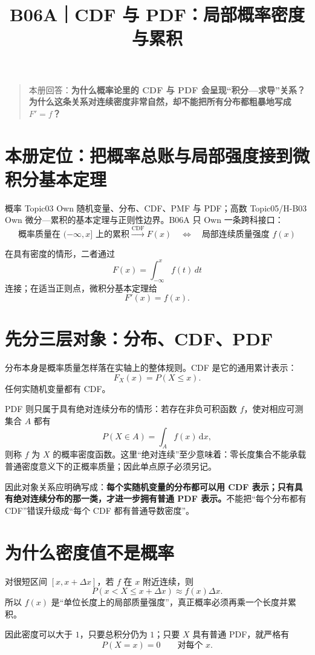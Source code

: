 \documentclass[profile=standard]{ipara-handbook}
\title{B06A｜CDF 与 PDF：局部概率密度与累积}
\author{}
\date{}
\begin{document}
\maketitle

\begin{quote}
本册回答：\textbf{为什么概率论里的 CDF 与 PDF 会呈现“积分—求导”关系？为什么这条关系对连续密度非常自然，却不能把所有分布都粗暴地写成 $F'=f$？}
\end{quote}

\section{本册定位：把概率总账与局部强度接到微积分基本定理}
概率 Topic03 Own 随机变量、分布、CDF、PMF 与 PDF；高数 Topic05/H-B03 Own 微分—累积的基本定理与正则性边界。B06A 只 Own 一条跨科接口：
\[
\boxed{
\text{概率质量在 }(-\infty,x]\text{ 上的累积}
\xrightarrow{\text{CDF}}
F(x)
\quad\Longleftrightarrow\quad
\text{局部连续质量强度 }f(x)
}
\]

在具有密度的情形，二者通过
\[
F(x)=\int_{-\infty}^{x}f(t)\,dt
\]
连接；在适当正则点，微积分基本定理给
\[
F'(x)=f(x).
\]

\section{先分三层对象：分布、CDF、PDF}
分布本身是概率质量怎样落在实轴上的整体规则。CDF 是它的通用累计表示：
\[
F_X(x)=P(X\le x).
\]
任何实随机变量都有 CDF。

PDF 则只属于具有绝对连续分布的情形：若存在非负可积函数 $f$，使对相应可测集合 $A$ 都有
\[
P(X\in A)=\int_A f(x)\,\mathrm{d}x,
\]
则称 $f$ 为 $X$ 的概率密度函数。这里“绝对连续”至少意味着：零长度集合不能承载普通密度意义下的正概率质量；因此单点原子必须另记。

因此对象关系应明确写成：\textbf{每个实随机变量的分布都可以用 CDF 表示；只有具有绝对连续分布的那一类，才进一步拥有普通 PDF 表示。}不能把“每个分布都有 CDF”错误升级成“每个 CDF 都有普通导数密度”。

\section{为什么密度值不是概率}
对很短区间 $[x,x+\Delta x]$，若 $f$ 在 $x$ 附近连续，则
\[
P(x<X\le x+\Delta x)
\approx f(x)\Delta x.
\]
所以 $f(x)$ 是“单位长度上的局部质量强度”，真正概率必须再乘一个长度并累积。

因此密度可以大于 $1$，只要总积分仍为 $1$；只要 $X$ 具有普通 PDF，就严格有
\[
P(X=x)=0\qquad\text{对每个 }x.
\]
\end{document}
